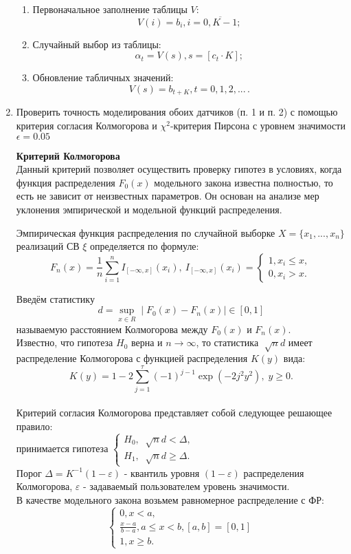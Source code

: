 \documentclass[12pt]{article}
\begin{document}
\begin{enumerate}
\begin{enumerate}
\item Первоначальное заполнение таблицы $ V $:
$$ V(i)=b_{i},i=\overline{0, K-1}; $$
\item Случайный выбор из таблицы: $$ \alpha_{t}=V(s), s=[c_{t} \cdot K]; $$
\item Обновление табличных значений:
$$ V(s) = b_{t + K}, t = 0,1,2,... \, . $$
\end{enumerate}
\newpage
\item Проверить точность моделирования обоих датчиков (п. 1 и п. 2) с помощью критерия согласия Колмогорова и $ \chi^{2} $-критерия Пирсона с уровнем значимости $ \epsilon = 0.05 $
\par \textbf{Критерий Колмогорова}
\\Данный критерий позволяет осуществить проверку гипотез в условиях, когда функция распределения $ F_{0}(x) $ модельного закона известна полностью, то есть не зависит от неизвестных параметров. Он основан на анализе мер уклонения эмпирической и модельной функций распределения.
\par Эмпирическая функция распределения по случайной выборке $ X = \lbrace x_{1},...,x_{n} \rbrace $ реализаций СВ $ \xi $ определяется по формуле:
$$
F_{n}(x) = \frac{1}{n} \sum\limits_{i=1}^{n} I_{[-\infty, x]} (x_{i}),\: I_{[-\infty, x]} (x_{i}) = 
	\begin{cases}
			1, x_{i} \leq x, \\
			0, x_{i} > x.
	\end{cases}
$$
\par Введём статистику
$$
d = \sup_{x \in R} \mid F_{0}(x) - F_{n}(x) \mid \in [0, 1]
$$
называемую расстоянием Колмогорова между $ F_{0}(x) $ и $ F_{n}(x) $.
\\Известно, что гипотеза $ H_{0} $ верна и $ n \longrightarrow \infty $, то статистика $ \sqrt[]{n} d $ имеет распределение Колмогорова с функцией распределения $ K(y) $ вида:
$$ K(y) = 1 - 2 \sum_{j=1}^{\tau} (-1)^{j - 1} \exp(-2 j^2 y^2),\; y\geq 0 .$$
\\Критерий согласия Колмогорова представляет собой следующее решающее правило:
\\принимается гипотеза 
$ 
	\begin{cases}
			H_{0},\; \sqrt[]{n} d < \Delta, \\
			H_{1},\; \sqrt[]{n} d \geq \Delta.
	\end{cases} 
$
\\Порог $ \Delta = K^{-1}(1 - \varepsilon) $ - квантиль уровня $ (1 - \varepsilon) $ распределения Колмогорова, $ \varepsilon $ - задаваемый пользователем уровень значимости.
\\В качестве модельного закона возьмем равномерное распределение с ФР:
$$
	\begin{cases}
			0, x < a, \\
			\frac{x - a}{b - a}, a \leq x < b, [a, b] = [0, 1] \\
			1, x \geq b.
	\end{cases}
$$


\end{enumerate}
\end{document}

